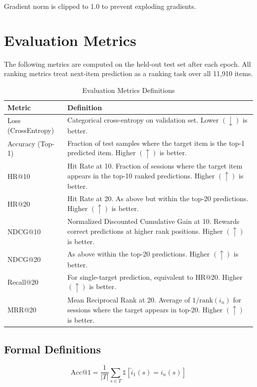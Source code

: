 \documentclass[12pt,a4paper]{report}
\begin{document}
Gradient norm is clipped to 1.0 to prevent exploding gradients.

\section{Evaluation Metrics}

The following metrics are computed on the held-out test set after each epoch.
All ranking metrics treat next-item prediction as a ranking task over all
11,910 items.

\begin{table}[H]
\centering
\caption{Evaluation Metrics Definitions}
\begin{tabular}{p{2.5cm} p{9cm}}
\toprule
\textbf{Metric}   & \textbf{Definition} \\
\midrule
Loss (CrossEntropy)
  & Categorical cross-entropy on validation set. Lower $(\downarrow)$ is better. \\[4pt]
Accuracy (Top-1)
  & Fraction of test samples where the target item is the top-1 predicted item. Higher $(\uparrow)$ is better. \\[4pt]
HR@10
  & Hit Rate at 10. Fraction of sessions where the target item appears in the top-10 ranked predictions. Higher $(\uparrow)$ is better. \\[4pt]
HR@20
  & Hit Rate at 20. As above but within the top-20 predictions. Higher $(\uparrow)$ is better. \\[4pt]
NDCG@10
  & Normalized Discounted Cumulative Gain at 10. Rewards correct predictions at higher rank positions. Higher $(\uparrow)$ is better. \\[4pt]
NDCG@20
  & As above within the top-20 predictions. Higher $(\uparrow)$ is better. \\[4pt]
Recall@20
  & For single-target prediction, equivalent to HR@20. Higher $(\uparrow)$ is better. \\[4pt]
MRR@20
  & Mean Reciprocal Rank at 20. Average of $1/\text{rank}(i_n)$ for sessions where the target appears in top-20. Higher $(\uparrow)$ is better. \\
\bottomrule
\end{tabular}
\label{tab:metrics_def}
\end{table}

\subsection{Formal Definitions}

\begin{equation}
\text{Acc@1} = \frac{1}{|T|} \sum_{s \in T} \mathbb{1}[\hat{i}_1(s) = i_n(s)]
\end{equation}
\end{document}
